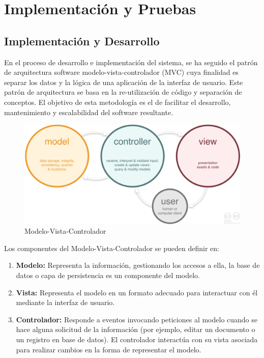 \documentclass[a4paper,11pt]{book}
\begin{document}
\chapter{ Implementación y Pruebas}


\section{Implementación y Desarrollo}

En el proceso de desarrollo e implementación del sistema, se ha seguido el patrón de arquitectura software modelo-vista-controlador (MVC)\cite{mvc} cuya finalidad es separar los datos y la lógica de una aplicación de la interfaz de usuario. Este patrón de arquitectura se basa en la re-utilización de código y separación de conceptos. El objetivo de esta metodología es el de facilitar el desarrollo, mantenimiento y escalabilidad del software resultante.

\begin{figure}[H]
\centering
\includegraphics[scale=0.20]{imagenes/mvc.png}
\caption{ Modelo-Vista-Controlador\cite{mvc2}  }
\end{figure}

Los componentes\cite{mvc3} del Modelo-Vista-Controlador se pueden definir en:

\begin{enumerate}
\item \textbf{Modelo:} Representa la información, gestionando los accesos a ella, la base de datos  o capa de persistencia es un componente del modelo.

\item \textbf{Vista:} Representa el modelo en un formato adecuado para interactuar con él mediante la interfaz de usuario.

\item \textbf{Controlador:} Responde a eventos invocando peticiones al modelo cuando se hace alguna solicitud de la información (por ejemplo, editar un documento o un registro en base de datos). El controlador interactúa con su vista asociada para realizar cambios en la forma de representar el modelo.
\end{enumerate}
\end{document}
